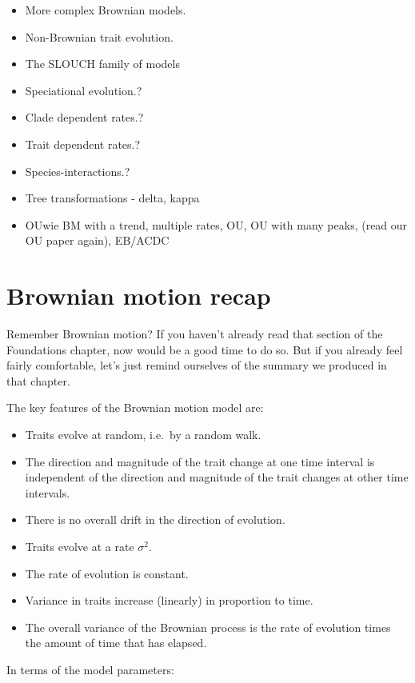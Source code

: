 \documentclass[]{book}
\providecommand{\tightlist}{%
  \setlength{\itemsep}{0pt}\setlength{\parskip}{0pt}}
\begin{document}
\begin{itemize}
\tightlist
\item
  More complex Brownian models.
\item
  Non-Brownian trait evolution.
\item
  The SLOUCH family of models
\item
  Speciational evolution.?
\item
  Clade dependent rates.?
\item
  Trait dependent rates.?
\item
  Species-interactions.?
\item
  Tree transformations - delta, kappa
\item
  OUwie BM with a trend, multiple rates, OU, OU with many peaks, (read
  our OU paper again), EB/ACDC
\end{itemize}

\section{Brownian motion recap}\label{brownian-motion-recap}

Remember Brownian motion? If you haven't already read that section of
the Foundations chapter, now would be a good time to do so. But if you
already feel fairly comfortable, let's just remind ourselves of the
summary we produced in that chapter.

The key features of the Brownian motion model are:

\begin{itemize}
\tightlist
\item
  Traits evolve at random, i.e.~by a random walk.
\item
  The direction and magnitude of the trait change at one time interval
  is independent of the direction and magnitude of the trait changes at
  other time intervals.
\item
  There is no overall drift in the direction of evolution.
\item
  Traits evolve at a rate \(\sigma^2\).
\item
  The rate of evolution is constant.
\item
  Variance in traits increase (linearly) in proportion to time.
\item
  The overall variance of the Brownian process is the rate of evolution
  times the amount of time that has elapsed.
\end{itemize}

In terms of the model parameters:
\end{document}
